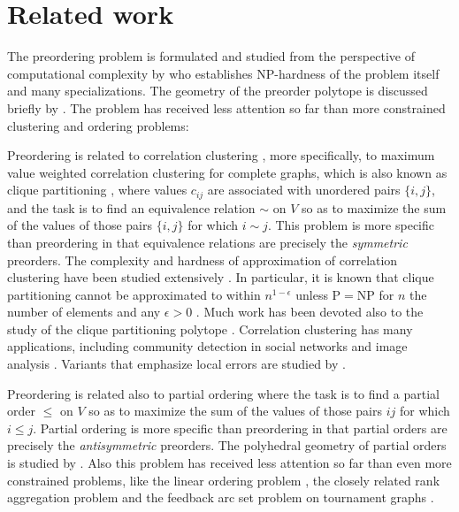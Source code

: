 \section{Related work}
\label{sec:related-work}

The preordering problem is formulated and studied from the perspective of computational complexity by \citet{wakabayashi1998complexity} who establishes \textsc{NP}-hardness of the problem itself and many specializations.
The geometry of the preorder polytope is discussed briefly by \citet{gurgel1992poliedros}.
The problem has received less attention so far than more constrained clustering and ordering problems:

Preordering is related to correlation clustering \cite{emanuel2003correlation,bansal2004correlation,demaine2006correlation}, more specifically, to maximum value weighted correlation clustering for complete graphs, which is also known as clique partitioning \cite{grotschel1989cutting}, where values $c_{ij}$ are associated with unordered pairs $\{i,j\}$, and the task is to find an equivalence relation $\sim$ on $V$ so as to maximize the sum of the values of those pairs $\{i,j\}$ for which $i \sim j$.
This problem is more specific than preordering in that equivalence relations are precisely the \emph{symmetric} preorders. 
The complexity and hardness of approximation of correlation clustering have been studied extensively \citep{swamy2004correlation,charikar2005clustering,chawla2015near,veldt2022correlation,cohen2022correlation,klein2023correlation}.
In particular, it is known that clique partitioning cannot be approximated to within $n^{1-\epsilon}$ unless \textsc{P}$=$\textsc{NP} for $n$ the number of elements and any $\epsilon > 0$ \citep{bachrach2013optimal,zuckerman2006linear}.
Much work has been devoted also to the study of the clique partitioning polytope
\cite{grotschel1990facets,grotschel1990composition,deza1991complete,deza1992clique,chopra1995facets,bandelt1999lifting,oosten2001clique,sorensen2002note,letchford2025new}.
Correlation clustering has many applications, including community detection in social networks \citep{brandes2007modularity,veldt2018correlation} and image analysis \citep{yarkony2012fast,beier2015fusion,aflalo2023deepcut,abbas2023clusterfug}.
Variants that emphasize local errors are studied by \citet{puleo2016correlation,kalhan2019correlation,ahmadian2020fair}.

Preordering is related also to partial ordering \citep{muller1996partial} where the task is to find a partial order $\leq$ on $V$ so as to maximize the sum of the values of those pairs $ij$ for which $i \leq j$.
Partial ordering is more specific than preordering in that partial orders are precisely the \emph{antisymmetric} preorders.
The polyhedral geometry of partial orders is studied by \citet{muller1996partial}.
Also this problem has received less attention so far than even more constrained problems, like the linear ordering problem \citep{grotschel1984cutting,marti2011linear,ceberio2015linear}, the closely related rank aggregation problem \citep{ailon2008aggregating,schalekamp2009rank} and the feedback arc set problem on tournament graphs \citep{karpinski2010faster}.

